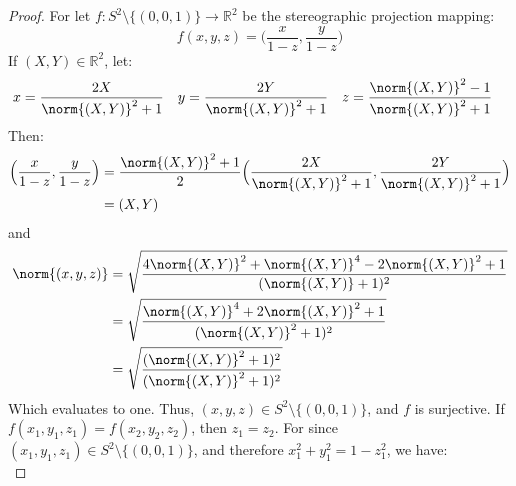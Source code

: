 \documentclass{article}                                                        %
\begin{document}
        \begin{proof}
            For let $f:S^{2}\setminus\{(0,0,1)\}\rightarrow \mathbb{R}^{2}$
            be the stereographic projection mapping:
            \begin{equation}
                f(x,y,z)=\Big(\frac{x}{1-z},\frac{y}{1-z}\Big)
            \end{equation}
            If $(X,Y)\in\mathbb{R}^{2}$, let:
            \begin{align*}
                x&=\frac{2X}{\norm{(X,Y)}^{2}+1}&
                y&=\frac{2Y}{\norm{(X,Y)}^{2}+1}&
                z&=\frac{\norm{(X,Y)}^{2}-1}{\norm{(X,Y)}^{2}+1} 
            \end{align*}
            Then:
            \begin{subequations}
                \begin{align}
                    \Big(\frac{x}{1-z},\frac{y}{1-z}\Big)
                    &=\frac{\norm{(X,Y)}^{2}+1}{2}
                    \Big(\frac{2X}{\norm{(X,Y)}^{2}+ 1},
                         \frac{2Y}{\norm{(X,Y)}^{2}+1}\Big)\\
                    &=(X,Y)
                \end{align}
            \end{subequations}
            and
            \begin{subequations}
                \begin{align}
                    \norm{(x,y,z)}&=\sqrt{%
                        \frac{4\norm{(X,Y)}^{2}+\norm{(X,Y)}^{4}-
                              2\norm{(X,Y)}^{2}+1}{(\norm{(X,Y)}+1)^{2}}%
                    }\\
                    &=\sqrt{\frac{\norm{(X,Y)}^{4}+2\norm{(X,Y)}^{2}+1}
                                 {(\norm{(X,Y)}^{2}+1)^{2}}}\\
                    &=\sqrt{%
                        \frac{(\norm{(X,Y)}^{2}+1)^{2}}
                             {(\norm{(X,Y)}^{2}+1)^{2}}%
                    }
                \end{align}
            \end{subequations}
            Which evaluates to one. Thus,
            $(x,y,z)\in S^{2}\setminus\{(0,0,1)\}$, and $f$ is surjective.
            If $f(x_{1},y_{1},z_{1})=f(x_{2},y_{2},z_{2})$, then
            $z_{1}=z_{2}$. For since
            $(x_{1},y_{1},z_{1})\in S^{2}\setminus\{(0,0,1)\}$,
            and therefore $x_{1}^{2}+y_{1}^{2}=1-z_{1}^{2}$, we have:
            \begin{equation}

\end{equation}
\end{proof}
\end{document}

